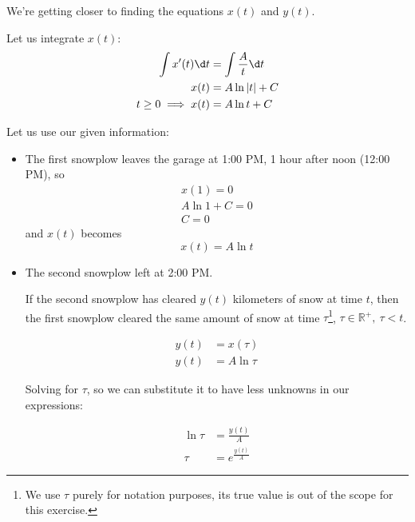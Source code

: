 \documentclass[a4paper,12pt]{article}
\begin{document}
        We're getting closer to finding the equations $x(t)$ and $y(t)$.

        \hfill \break
        Let us integrate $x(t)$:
        \begin{align*}
            \int x'(t) \d t &= \int{\frac{A}{t}} \d t \\
            x(t) &= A \ln |t|+C \\
            t \geq 0 \implies x(t) &= A \ln t + C
        \end{align*}
        
        Let us use our given information:
        \begin{itemize}
            \item The first snowplow leaves the garage at 1:00 PM, 1 hour after noon (12:00 PM), so
                \begin{gather*}
                    x(1) = 0 \\
                    A \ln 1 +C = 0 \\
                    C = 0
                \end{gather*}
                and $x(t)$ becomes
                \begin{equation}
                    x(t) = A \ln t
                    \label{eq:x(t)}
                \end{equation}

            \item The second snowplow left at 2:00 PM.

            If the second snowplow has cleared $y(t)$ kilometers of snow at time $t$, then the first snowplow cleared the same amount of snow at time $\tau$\footnote{ We use $\tau$ purely for notation purposes, its true value is out of the scope for this exercise.}, $\tau \in \mathbb{R^+}, \ \tau < t$.

            \begin{align*}
                y(t) &= x(\tau) \\
                y(t) &= A \ln \tau
            \end{align*}

            Solving for $\tau$, so we can substitute it to have less unknowns in our expressions:

            \begin{align*}
                \ln \tau &= \frac{y(t)}{A} \\
                \tau &= e^{\frac{y(t)}{A}}
            \end{align*}


\end{itemize}
\end{document}
